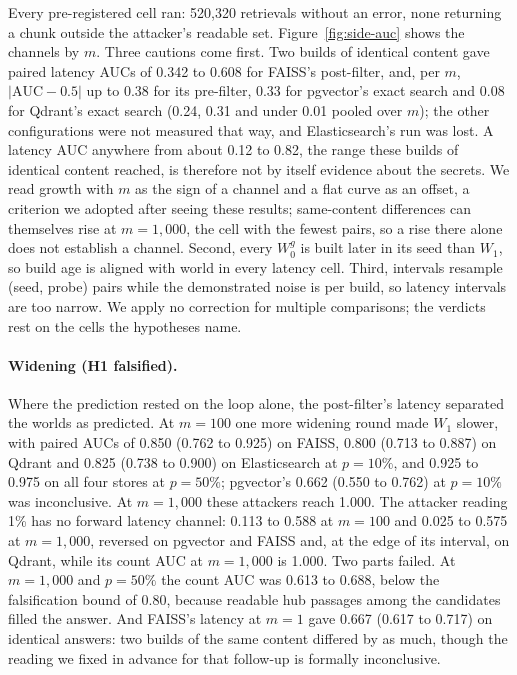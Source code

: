 Every pre-registered cell ran: 520,320 retrievals without an error, none returning a chunk outside the attacker's readable set.
Figure~\ref{fig:side-auc} shows the channels by $m$. Three cautions come first. Two builds of identical content gave paired latency AUCs
of 0.342 to 0.608 for FAISS's post-filter, and, per $m$, $|\mathrm{AUC} - 0.5|$ up to 0.38 for its pre-filter, 0.33 for pgvector's exact search and
0.08 for Qdrant's exact search (0.24, 0.31 and under 0.01 pooled over $m$); the other configurations were not measured that way, and Elasticsearch's run was lost. A latency AUC anywhere from about 0.12 to 0.82, the range these builds of identical content reached, is
therefore not by itself evidence about the secrets. We read growth with $m$ as the sign of a channel and a flat curve as an offset, a criterion we adopted after seeing these results; same-content differences can themselves rise at $m = 1{,}000$, the cell with the fewest pairs, so a rise there alone does not establish a channel. Second, every $W_0^g$ is built later in its seed than
$W_1$, so build age is aligned with world in every latency cell. Third, intervals resample (seed, probe) pairs while the demonstrated noise is per build, so latency intervals are too narrow. We apply no correction for multiple
comparisons; the verdicts rest on the cells the hypotheses name.

\paragraph{Widening (H1 falsified).}
Where the prediction rested on the loop alone, the post-filter's latency separated the worlds as predicted. At $m = 100$ one more widening round
made $W_1$ slower, with paired AUCs of 0.850 (0.762 to 0.925) on FAISS, 0.800 (0.713 to 0.887) on Qdrant and 0.825 (0.738 to 0.900) on
Elasticsearch at $p = 10\%$, and 0.925 to 0.975 on all four stores at $p = 50\%$; pgvector's 0.662 (0.550 to 0.762) at $p = 10\%$ was
inconclusive. At $m = 1{,}000$ these attackers reach 1.000. The attacker reading 1\% has no forward latency channel: 0.113 to 0.588 at $m = 100$ and 0.025 to 0.575 at $m = 1{,}000$, reversed on pgvector and FAISS and, at the edge of its interval, on Qdrant, while its count AUC at $m = 1{,}000$ is 1.000. Two parts failed. At $m = 1{,}000$ and $p = 50\%$ the count AUC was 0.613 to 0.688, below the falsification bound of 0.80, because
readable hub passages among the candidates filled the answer. And FAISS's latency at $m = 1$ gave 0.667 (0.617 to 0.717) on identical answers:
two builds of the same content differed by as much, though the reading we fixed in advance for that follow-up is formally inconclusive.

